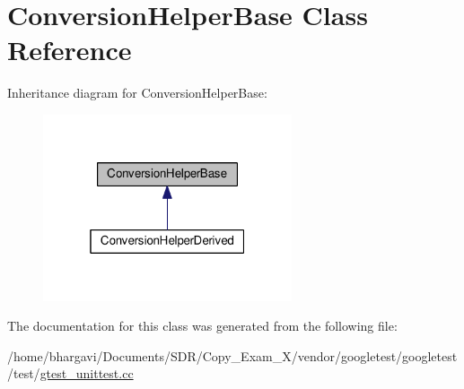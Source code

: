 \hypertarget{class_conversion_helper_base}{}\section{Conversion\+Helper\+Base Class Reference}
\label{class_conversion_helper_base}


Inheritance diagram for Conversion\+Helper\+Base\+:
\nopagebreak
\begin{figure}[H]
\begin{center}
\leavevmode
\includegraphics[width=208pt]{class_conversion_helper_base__inherit__graph}
\end{center}
\end{figure}


The documentation for this class was generated from the following file\+:\begin{DoxyCompactItemize}
\item 
/home/bhargavi/\+Documents/\+S\+D\+R/\+Copy\+\_\+\+Exam\+\_\+X/vendor/googletest/googletest/test/\hyperlink{gtest__unittest_8cc}{gtest\+\_\+unittest.\+cc}\end{DoxyCompactItemize}
